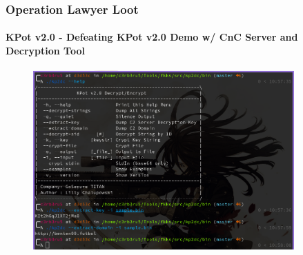 \documentclass[aspectratio=169]{beamer}
\begin{document}
{
  \begin{frame}[fragile]{}
    \frametitle{Operation Lawyer Loot}
    \framesubtitle{KPot v2.0 - Defeating KPot v2.0 Demo w/ CnC Server and
      Decryption Tool}
    \begin{figure}[hp]
      \centering
      \includegraphics[width=10cm]{kpot-decryption-tool}
    \end{figure}
\end{frame}
}
\end{document}
